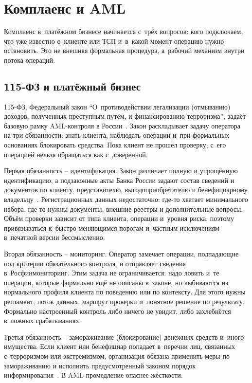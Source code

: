 
\chapter{Комплаенс и AML}\label{ch:compliance-aml}
Комплаенс в~платёжном бизнесе начинается с~трёх вопросов: кого
подключаем, что уже известно о~клиенте или ТСП и~в~какой момент
операцию нужно остановить. Это не внешняя формальная процедура,
а~рабочий механизм внутри потока операций.

\section{115-ФЗ и платёжный бизнес}\label{sec:compliance-115fz}

115-ФЗ, Федеральный закон \enquote{О~противодействии
  легализации (отмыванию) доходов, полученных преступным путём, и
финансированию терроризма}, задаёт базовую рамку AML-контроля в
России~\cite{fz-115}. Закон раскладывает задачу оператора на три
обязанности: знать клиента, наблюдать операции и~при формальных
основаниях блокировать средства. Пока клиент не прошёл проверку,
с~его операцией нельзя обращаться как с~доверенной.

Первая обязанность -- идентификация. Закон различает полную
и упрощённую идентификацию, а подзаконные акты Банка России задают
состав сведений и документов по клиенту, представителю,
выгодоприобретателю и бенефициарному владельцу~\cite{cbr-499p}.
Регистрационных данных недостаточно: где-то хватает минимального
набора, где-то нужны документы, внешние реестры и дополнительные
вопросы. Объём проверки зависит от типа клиента, операции и~уровня
риска, поэтому привязываться к~быстро меняющимся порогам и~частным
исключениям в~печатной версии бессмысленно.

Вторая обязанность -- мониторинг. Оператор замечает операции,
подпадающие под критерии обязательного контроля, и отправляет
сведения в~Росфинмониторинг. Этим задача не ограничивается: надо
ловить и~те операции, которые формально ещё не описаны в~законе,
но выбиваются из нормального профиля клиента по поведению или по
контексту. Для этого нужны регламент, поток данных, маршрут проверки
и~понятное решение по результату. Формально настроенный контроль
либо ничего не увидит, либо захлебнётся в~ложных срабатываниях.

Третья обязанность -- замораживание (блокирование) денежных средств
и~иного имущества. Если клиент или бенефициар попадает в~перечни лиц,
связанных с~терроризмом или экстремизмом, организация обязана
применить меры по замораживанию и исполнить предусмотренный законом
порядок информирования~\cite{fz-115}. В AML промедление опаснее
жёсткости.

